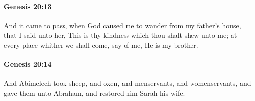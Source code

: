 		\paragraph{Genesis 20:13} %
			\label{GENESIS-20-13}

			And it came to pass, when God caused me to wander from my father's house, that I said unto her, This is thy kindness which thou shalt shew unto me; at every place whither we shall come, say of me, He is my brother.


		\paragraph{Genesis 20:14} %
			\label{GENESIS-20-14}

			And Abimelech took sheep, and oxen, and menservants, and womenservants, and gave them unto Abraham, and restored him Sarah his wife.


